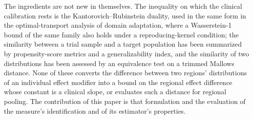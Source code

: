 \documentclass[AMA,Times1COL]{WileyNJDv5}
\begin{document}
The ingredients are not new in themselves. The inequality on which the clinical calibration rests is the Kantorovich--Rubinstein duality, used in the same form in the optimal-transport analysis of domain adaptation,\cite{shen2018} where a Wasserstein-1 bound of the same family also holds under a reproducing-kernel condition;\cite{redko2017} the similarity between a trial sample and a target population has been summarized by propensity-score metrics\cite{stuart2011} and a generalizability index,\cite{tipton2014} and the similarity of two distributions has been assessed by an equivalence test on a trimmed Mallows distance.\cite{munk1998} None of these converts the difference between two regions' distributions of an individual effect modifier into a bound on the regional effect difference whose constant is a clinical slope, or evaluates such a distance for regional pooling. The contribution of this paper is that formulation and the evaluation of the measure's identification and of its estimator's properties.

\end{document}

